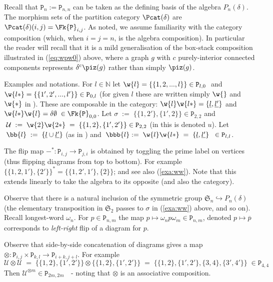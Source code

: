 \documentclass[reqno,10pt,a4paper]{amsart}
\newcommand{\U}{\mathcal{U}}
\newcommand{\N}{\mathbb{N}}
\newcommand{\beq}{\begin{equation}}
\newcommand{\eq}{\end{equation}}
\newcommand{\red}[1]{\textcolor{red}{#1}}
\newcommand{\ppm}[1]{\red{#1}}
\newcommand{\nk}{n}  %
\newcommand{\Sym}{\mathfrak{S}}
\newcommand{\rmP}{{\mathtt P}} %
\begin{document}
Recall 
that $\rmP_n := \rmP_{n,n}$ 
can be taken as
the defining basis of the algebra $P_\nk(\delta)$. 
The morphism sets 
of the partition category $\Pcat(\delta)$ are 
$\Pcat(\delta)(i,j) = \Fk \rmP_{i,j}$. 
As noted, we assume familiarity with the category composition
(which, when $i=j=n$, is the algebra composition).
In particular the reader will recall that it is a mild generalisation of the 
box-stack composition %
illustrated in (\ref{eq:wpw0})
above,
where a graph $g$ with $c$ purely-interior connected components represents 
$\delta^c \piz(g)$ rather than simply $\piz(g)$. 

%

\mdef  \label{exa:ww}
Examples and notations. 
For $l \in \N$ 
let $\w{l} = \{ \{1,2,...,l \}\}  \in \rmP_{l,0} \;$ and 
$\w{l*} = \{ \{1',2',...,l' \}\} \in \rmP_{0,l}$
(for given $l$ these are written simply $\w{}$ and $\w{*}$ in \cite[(2.4)]{amm2019tonal}). 
These are composable in the category:
$\w{l} \w{l*} = \{\underline{l}, \underline{l'} \}$
and
$\w{l*} \w{l} = \delta \emptyset \; \in \Fk \rmP_{0,0}$.
Let 
$\sigma \; := \;  \{\{1,2'\},\{1',2\}\}   \in \rmP_{2,2} $
and 
$
\;\U \; :=\;  \w{2} \w{2*} \; = \; \{\{1,2\},\{1',2'\}\}   \in \rmP_{2,2}  %
$
(in \cite[(2.2)]{amm2019tonal} this is denoted $u$). 
Let 
$ \;  \bb{l} \; := \;
\{\underline{l} \cup \underline{l'} \} $
(as in \cite[(2.2)]{amm2019tonal})
and 
$\; \bbb{l} := \; \w{l} \w{l*} \; = \; 
\{\underline{l} , \underline{l'} \} 
\;  \; \in\rmP_{l,l} $. 



\mdef \label{de:flip}
The flip map $-^* : \rmP_{i,j} \rightarrow \rmP_{j,i}$ is obtained by toggling the prime label
on vertices (thus flipping diagrams from top to bottom). 
For example $\{\{1,2,1'\},\{2'\}\}^* = \{\{1,2',1'\},\{2\}\}$;
and see also (\ref{exa:ww}).
Note that this extends linearly to take the algebra to its opposite (and also the category). 

Observe that there is a natural inclusion 
of the symmetric group
$\Sym_n \hookrightarrow P_n(\delta)$
(the elementary transposition in $\Sym_2$ passes to $\sigma$ in (\ref{exa:ww}) above, and so on). 
Recall longest-word $\omega_n$. 
For $p \in \rmP_{n,m} $
the map $p \mapsto \omega_n p \omega_m  \in \rmP_{n,m}$,
denoted $p \mapsto \overline{p}$ 
corresponds to {\em left-right} flip of a diagram for $p$. 

\mdef  \label{pa:U}
Observe that side-by-side concatenation of diagrams gives a map
$\otimes : \rmP_{i,j} \times \rmP_{k,l} \rightarrow \rmP_{i+k,j+l}$.
%
%
For example %
\beq 
\U \otimes \U \; = \; 
\{\{1,2\},\{1',2'\}\} \otimes \{\{1,2\},\{1',2'\}\} 
\; = \;
\{\{1,2\},\{1',2'\}, \{3,4\},\{3',4'\} \}  \; \in \rmP_{4,4} 
\eq 
Then 
$\U^{\otimes m} \in \rmP_{2m,2m}$  $\;$ 
- noting that $\otimes$ is an associative composition. 
\end{document}
